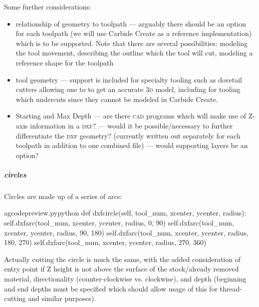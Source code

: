 \documentclass{ltxdoc}
\begin{document}
 
Some further considerations:

\begin{itemize}
 \item relationship of geometry to toolpath --- arguably there should be an option for each
       toolpath (we will use Carbide Create as a reference implementation) which is to be 
       supported. Note that there are several possibilities: modeling the tool movement, 
       describing the outline which the tool will cut, modeling a reference shape for the toolpath
 \item tool geometry --- support is included for specialty tooling 
       such as dovetail cutters allowing one to to get an accurate \textsc{3d} model, including for tooling which
       undercuts since they cannot be modeled in Carbide Create.
 \item Starting and Max Depth --- are there \textsc{cad} programs which will make use of Z-axis information 
       in a \textsc{dxf}? --- would it be possible/necessary to further differentiate the \textsc{dxf} geometry?
       (currently  written out separately for each toolpath in addition to one combined file) --- would supporting layers be an option?
\end{itemize}

\subparagraph{circles}

Circles are made up of a series of arcs:

\lstset{firstnumber=\thegcpy}
\begin{writecode}{a}{gcodepreview.py}{python}
    def dxfcircle(self, tool_num, xcenter, ycenter, radius):
        self.dxfarc(tool_num, xcenter, ycenter, radius,  0, 90)
        self.dxfarc(tool_num, xcenter, ycenter, radius, 90, 180)
        self.dxfarc(tool_num, xcenter, ycenter, radius, 180, 270)
        self.dxfarc(tool_num, xcenter, ycenter, radius, 270, 360)

\end{writecode}
\addtocounter{gcpy}{6}

Actually cutting the circle is much the same, with the added consideration of entry point if Z height is not above the surface of the stock/already removed material, directionality (counter-clockwise vs. clockwise), and depth (beginning and end depths must be specified which should allow usage of this for thread-cutting and similar purposes).
\end{document}
